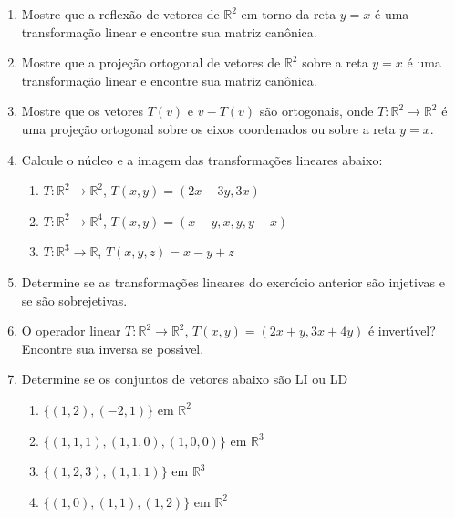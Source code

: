 \documentclass[a4paper,5pt]{amsbook}
\begin{document}
\begin{enumerate}
	\vspace{0.5cm}
	\item Mostre que a reflex\~ao de vetores de $\mathbb{R}^2$ em torno da
		reta $y=x$ \'e uma transforma\c{c}\~ao linear e encontre sua matriz can\^onica.

	\vspace{0.5cm}
	\item Mostre que a proje\c{c}\~ao ortogonal de vetores de $\mathbb{R}^2$ sobre a
		reta $y=x$ \'e uma transforma\c{c}\~ao linear e encontre sua matriz can\^onica.

	\vspace{0.5cm}
	\item Mostre que os vetores $T(v)$ e $v - T(v)$ s\~ao ortogonais, onde
		$T:\mathbb{R}^2 \rightarrow \mathbb{R}^2$ \'e uma proje\c{c}\~ao ortogonal
		sobre os eixos coordenados ou sobre a reta $y=x$.

	\vspace{0.5cm}
	\item Calcule o n\'ucleo e a imagem das transforma\c{c}\~oes lineares abaixo:
		\begin{enumerate}
			\item $T:\mathbb{R}^2 \rightarrow \mathbb{R}^2$,
				$T(x,y) = (2x-3y, 3x)$
			\item $T:\mathbb{R}^2 \rightarrow \mathbb{R}^4$,
				$T(x,y) = (x-y, x, y, y - x)$
			\item $T:\mathbb{R}^3 \rightarrow \mathbb{R}$,
				$T(x,y,z) = x - y + z$
		\end{enumerate}

	\vspace{0.5cm}
	\item Determine se as transforma\c{c}\~oes lineares do exerc\'{\i}cio anterior s\~ao
		injetivas e se s\~ao sobrejetivas.

	\vspace{0.5cm}
	\item O operador linear $T:\mathbb{R}^2 \rightarrow \mathbb{R}^2$, $T(x,y)
		= (2x+y, 3x+4y)$ \'e invert\'{\i}vel? Encontre sua inversa se poss\'{\i}vel.

	\vspace{0.5cm}
	\item Determine se os conjuntos de vetores abaixo s\~ao LI ou LD
		\begin{enumerate}
			\item $\{(1,2), (-2, 1)\}$ em $\mathbb{R}^2$
			\item $\{(1,1,1), (1,1,0), (1,0,0)\}$ em $\mathbb{R}^3$
			\item $\{(1,2,3), (1,1,1)\}$ em $\mathbb{R}^3$
			\item $\{(1,0), (1,1), (1,2)\}$ em $\mathbb{R}^2$
		\end{enumerate}


\end{enumerate}
\end{document}

